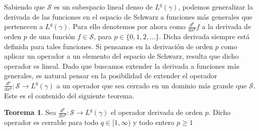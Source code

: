 \documentclass[letterpaper,twoside,12pt]{book}
\renewcommand{\S}{\mathcal{S}}
\newcommand{\1}{\mathds{1}}
\renewcommand{\to}{\rightarrow}
\theoremstyle{definition}
\theoremstyle{definition}
\newtheorem{teo}{Teorema}
\theoremstyle{definition}
\theoremstyle{definition}
\theoremstyle{definition}
\theoremstyle{definition}
\theoremstyle{definition}
\begin{document}
Sabiendo que $\mathcal{S}$ es un subespacio lineal denso de $L^{q}(\gamma)$, podemos generalizar la derivada de las funciones en el espacio de Schwarz a funciones más generales que pertenecen a $L^{q}(\gamma)$. Para ello denotemos por ahora como $\frac{d^p}{dx^p}f$ a la derivada de orden $p$ de una función $f\in \S$, para $p\in \{0,1,2,...\}$. Dicha derivada siempre está definida para tales funciones. Si pensamos en la derivación de orden $p$ como aplicar un operador a un elemento del espacio de Schwarz, resulta que dicho operador es lineal. Dado que buscamos extender la derivada a funciones más generales, es natural pensar en la posibilidad de extender el operador $\frac{d^p}{dx^{p}}:\S\to L^{q}(\gamma)$ a un operador que sea cerrado en un dominio más grande que $\S$. Este es el contenido del siguiente teorema.
\begin{teo} 
 Sea $\frac{d^{p}}{dx^p}:\mathcal{S}\longrightarrow L^{q}(\gamma)$ el operador derivada de orden $p$. Dicho operador es cerrable para todo $q\in [1,\infty)$ y todo entero $p\geq1$
 \end{teo}
\end{document}
